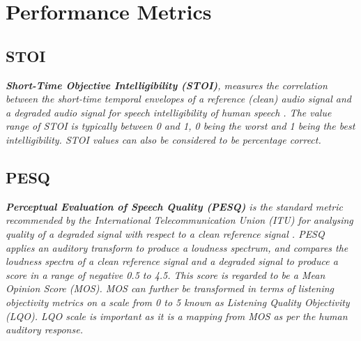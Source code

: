 
\chapter{Performance Metrics} %

\label{AppendixA} %

\section{STOI}
\textit{\textbf{Short-Time Objective Intelligibility (STOI)}, measures the correlation between the short-time temporal envelopes of a reference (clean) audio signal and a degraded audio signal for speech intelligibility of human speech \cite{ref:ieee_stoi}. The value range of STOI is typically between 0 and 1, 0 being the worst and 1 being the best intelligibility. STOI values can also be considered to be percentage correct.}

\section{PESQ}
\textit{\textbf{Perceptual Evaluation of Speech Quality (PESQ)} is the standard metric recommended by the International Telecommunication Union (ITU) for analysing quality of a degraded signal with respect to a clean reference signal \cite{ref:pesq}. PESQ applies an auditory transform to produce a loudness spectrum, and compares the loudness spectra of a clean reference signal and a degraded signal to produce a score in a range of negative 0.5 to 4.5. This score is regarded to be a Mean Opinion Score (MOS). MOS can further be transformed in terms of listening objectivity metrics on a scale from 0 to 5 known as Listening Quality Objectivity (LQO). LQO scale is important as it is a mapping from MOS as per the human auditory response.}
